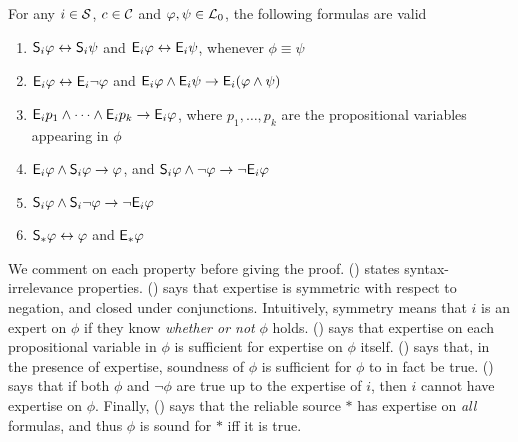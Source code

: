 \begin{proposition}
\label{kr_prop_validities}
For any $i \in \srcs$, $c \in \C$ and $\phi, \psi \in \lprop$, the following
formulas are valid
\begin{enumerate}
    \item \label{kr_item_replacement_equivalents_e_s}
          $\S_i\phi \leftrightarrow \S_i\psi$ and $\E_i\phi \leftrightarrow
          \E_i\psi$, whenever $\phi \equiv \psi$
    \item \label{kr_item_e_symmetric}
          $\E_i\phi \leftrightarrow \E_i\neg\phi$ and $\E_i\phi \land
          \E_i\psi \rightarrow \E_i(\phi \land \psi)$
    \item \label{kr_item_exp_on_all_variables} $\E_i{p_1} \land \cdots \land
          \E_i{p_k} \rightarrow \E_i\phi$, where $p_1, \ldots, p_k$ are the
          propositional variables appearing in $\phi$
    \item \label{kr_item_e_and_s_implies_phi}
          $\E_i\phi \land \S_i\phi \rightarrow \phi$, and
          $\S_i\phi \land \neg \phi \rightarrow \neg \E_i\phi$
    \item \label{kr_item_sound_neg_pair}
          $\S_i\phi \land \S_i{\neg \phi} \rightarrow \neg \E_i\phi$
    \item \label{kr_item_star_exp}
          $\S_\ast{\phi} \leftrightarrow \phi$ and $\E_\ast\phi$
\end{enumerate}
\end{proposition}

We comment on each property before giving the proof.
() states syntax-irrelevance
properties.
%
() says that expertise is symmetric with respect to
negation, and closed under conjunctions. Intuitively, symmetry means that $i$
is an expert on $\phi$ if they know \emph{whether or not} $\phi$ holds.
%
() says that expertise on each
propositional variable in $\phi$ is sufficient for expertise on $\phi$ itself.
%
() says that, in the presence of expertise,
soundness of $\phi$ is sufficient for $\phi$ to in fact be true.
%
() says that if both $\phi$ and $\neg\phi$ are
true up to the expertise of $i$, then $i$ cannot have expertise on $\phi$.
%
Finally, () says that the reliable source $\ast$ has
expertise on \emph{all} formulas, and thus $\phi$ is sound for $\ast$ iff it is
true.

